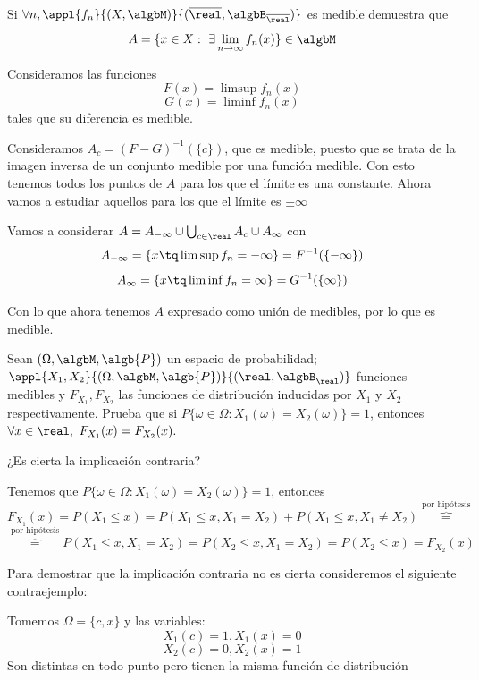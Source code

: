 \begin{problem}[5]
Si $\forall n, \appl{f_n}{(X,\algbM)}{(\overline{\real}, \algbB_{\overline{\real}})}$ es medible demuestra que
\[A = \{x \in X : \ \exists  \lim_{n \to \infty} f_n(x)\} \in \algbM\]
\solution

Consideramos las funciones
\[F(x) = \limsup f_n(x) \]
\[G(x) = \liminf f_n(x) \]
tales que su diferencia es medible.

Consideramos $A_c=(F-G)^{-1}(\{c\})$, que es medible, puesto que se trata de la imagen inversa de un conjunto medible por una función medible. Con esto tenemos todos los puntos de $A$ para los que el límite es una constante. Ahora vamos a estudiar aquellos para los que el límite es $\pm \infty$

Vamos a considerar $A=A_{-\infty} \cup \bigcup_{c \in \real} A_c \cup A_{\infty}$ con
\[A_{-\infty} = \{x \tq \limsup f_n = -\infty\}=F^{-1}(\{-\infty\})\]
\[A_{\infty} = \{x \tq \liminf f_n = \infty\}=G^{-1}(\{\infty\})\]

Con lo que ahora tenemos $A$ expresado como unión de medibles, por lo que es medible.

\end{problem}

\begin{problem}[6]
Sean $(\Omega, \algbM, \algb{P})$ un espacio de probabilidad; $\appl{X_1, X_2}{(\Omega, \algbM, \algb{P})}{(\real, \algbB_{\real})}$ funciones medibles y $F_{X_1}, F_{X_2}$ las funciones de distribución inducidas por $X_1$ y $X_2$ respectivamente. Prueba que si $P\{\omega \in \Omega : X_1(\omega)=X_2(\omega)\}=1$, entonces $\forall x \in \real, \ F_{X_1}(x) = F_{X_2}(x).$

¿Es cierta la implicación contraria?

\solution
Tenemos que $P\{\omega \in \Omega : X_1(\omega)=X_2(\omega)\}=1$, entonces
\[F_{X_1}(x) = P(X_1 \leq x) = P(X_1 \leq x, X_1=X_2) + P(X_1 \leq x, X_1 \neq X_2) \overbrace{=}^{\text{por hipótesis}}  \]
\[\overbrace{=}^{\text{por hipótesis}}  P(X_1 \leq x, X_1=X_2) = P(X_2 \leq x, X_1=X_2)=P(X_2  \leq x)=F_{X_2}(x)\]

Para demostrar que la implicación contraria no es cierta consideremos el siguiente contraejemplo:

Tomemos $\Omega = \{c,x\}$ y las variables:
\[X_1(c)=1, X_1(x)=0\]
\[X_2(c)=0, X_2(x)=1\]
Son distintas en todo punto pero tienen la misma función de distribución
\end{problem}

